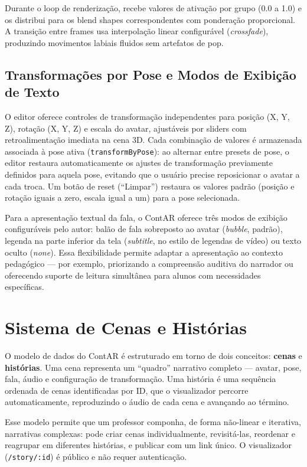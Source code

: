 \documentclass[
  12pt,
  openright,
  twoside,
  a4paper,
  english,
  brazil
]{abntex2}
\begin{document}
Durante o loop de renderização, recebe valores de ativação por grupo
(0.0 a 1.0) e os distribui para os blend shapes correspondentes com
ponderação proporcional. A transição entre frames usa interpolação
linear configurável (\textit{crossfade}), produzindo movimentos labiais
fluidos sem artefatos de pop.

\subsection{Transformações por Pose e Modos de Exibição de Texto}
\label{subsec:transform-display}

O editor oferece controles de transformação independentes para
posição (X, Y, Z), rotação (X, Y, Z) e escala do avatar, ajustáveis
por sliders com retroalimentação imediata na cena 3D. Cada combinação
de valores é armazenada associada à pose ativa (\texttt{transformByPose}):
ao alternar entre presets de pose, o editor restaura automaticamente os
ajustes de transformação previamente definidos para aquela pose,
evitando que o usuário precise reposicionar o avatar a cada troca.
Um botão de reset (``Limpar'') restaura os valores padrão (posição e
rotação iguais a zero, escala igual a um) para a pose selecionada.

Para a apresentação textual da fala, o ContAR oferece três modos de
exibição configuráveis pelo autor: balão de fala sobreposto ao avatar
(\textit{bubble}, padrão), legenda na parte inferior da tela
(\textit{subtitle}, no estilo de legendas de vídeo) ou texto oculto
(\textit{none}). Essa flexibilidade permite adaptar a apresentação ao
contexto pedagógico — por exemplo, priorizando a compreensão auditiva
do narrador ou oferecendo suporte de leitura simultânea para alunos
com necessidades específicas.

\section{Sistema de Cenas e Histórias}
\label{sec:cenas-historias}

O modelo de dados do ContAR é estruturado em torno de dois conceitos:
\textbf{cenas} e \textbf{histórias}. Uma cena representa um ``quadro''
narrativo completo — avatar, pose, fala, áudio e configuração de transformação.
Uma história é uma sequência ordenada de cenas identificadas por ID,
que o visualizador percorre automaticamente, reproduzindo o áudio de
cada cena e avançando ao término.

Esse modelo permite que um professor componha, de forma não-linear e
iterativa, narrativas complexas: pode criar cenas individualmente,
revisitá-las, reordenar e reagrupar em diferentes histórias, e publicar
com um link único. O visualizador (\texttt{/story/:id}) é público e
não requer autenticação.
\end{document}
